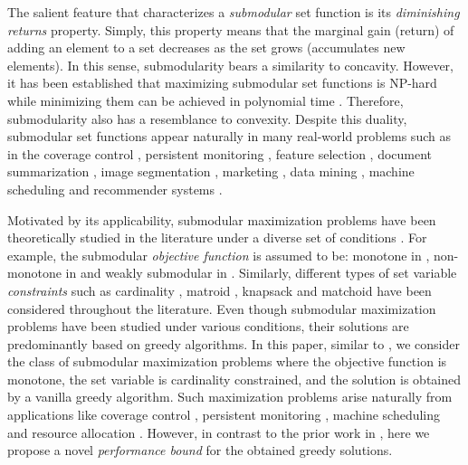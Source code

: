 \documentclass[conference]{IEEEtran}
\begin{document}
The salient feature that characterizes a \emph{submodular} set function is its \emph{diminishing returns} property. Simply, this property means that the marginal gain (return) of adding an element to a set decreases as the set grows (accumulates new elements). In this sense, submodularity bears a similarity to concavity. However, it has been established that maximizing submodular set functions is NP-hard \cite{Corneuejols1977,Nemhauser1978} while minimizing them can be achieved in polynomial time \cite{Grotschel1981,Schrijver2000}. Therefore, submodularity also has a resemblance to convexity. Despite this duality, submodular set functions appear naturally in many real-world problems such as in the coverage control \cite{Sun2020,Sun2019}, persistent monitoring \cite{Rezazadeh2019}, feature selection \cite{Das2008}, document summarization \cite{lin-bilmes-2011-class}, image segmentation \cite{Jegelka2011}, marketing \cite{Kempe2003}, data mining \cite{Mirzasoleiman2013}, machine scheduling \cite{LiuSiwen2020} and recommender systems \cite{El-Arini2011}.



Motivated by its applicability, submodular maximization problems have been theoretically studied in the literature under a diverse set of conditions \cite{Liu2020}. For example, the submodular \emph{objective function} is assumed to be: monotone in \cite{Wang2016}, non-monotone in \cite{Fahrbach2019} and weakly submodular in \cite{Khanna2017}. Similarly, different types of set variable \emph{constraints} such as cardinality \cite{Nemhauser1978}, matroid \cite{Fisher1978}, knapsack \cite{Wolsey1984} and matchoid \cite{Badanidiyuru2020} have been considered throughout the literature. 
Even though submodular maximization problems have been studied under various conditions, their solutions are predominantly based on greedy algorithms.
In this paper, similar to \cite{Nemhauser1978,Conforti1984,Wang2016,Liu2018}, we consider the class of submodular maximization problems where the objective function is monotone, the set variable is cardinality constrained, and the solution is obtained by a vanilla greedy algorithm. Such maximization problems arise naturally from applications like coverage control \cite{Sun2020,Sun2019}, persistent monitoring \cite{Rezazadeh2019}, machine scheduling \cite{LiuSiwen2020} and resource allocation \cite{Liu2020}.
However, in contrast to the prior work in \cite{Nemhauser1978,Conforti1984,Wang2016,Liu2018}, here we propose a novel \emph{performance bound} for the obtained greedy solutions. 
\end{document}
